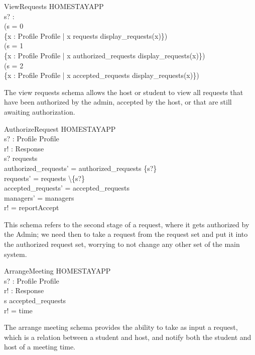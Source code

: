 \documentclass[11pt]{article}
\begin{document}
\begin{schema}{ViewRequests}
	\Xi HOMESTAYAPP\\
	s? : \nat\\
\where
	(s = 0\ \wedge\\
	\indent\{\forall x : Profile \rightarrow Profile | x \in requests \bullet display\_requests(x)\})\ \vee\\
	
	(s = 1\ \wedge\\
	\indent\{\forall x : Profile \rightarrow Profile | x \in authorized\_requests \bullet display\_requests(x)\})\ \vee\\
	
	(s = 2\ \wedge\\
	\indent\{\forall x : Profile \rightarrow Profile | x \in accepted\_requests \bullet display\_requests(x)\})
\end{schema}
The view requests schema allows the host or student to view all requests that have been authorized by the admin, accepted by the host, or that are still awaiting authorization.

\begin{schema}{AuthorizeRequest}
	\Delta HOMESTAYAPP\\
	s? : Profile \rightarrow Profile\\
	r! : Response\\
\where
	s? \in requests\\
	authorized\_requests' = authorized\_requests \cup \{s?\}\\
	requests' = requests \backslash \{s?\}\\
	accepted\_requests' = accepted_requests\\
	managers' = managers\\
	r! = reportAccept\\
\end{schema}
This schema refers to the second stage of a request, where it gets authorized by the Admin; we need then to take a request from the request set and put it into the authorized request set, worrying to not change any other set of the main system.

\begin{schema}{ArrangeMeeting}
	\Delta HOMESTAYAPP\\
	s? : Profile \rightarrow Profile\\
	r! : Response\\
\where
	s \in accepted\_requests\\
	r! = time
\end{schema}
The arrange meeting schema provides the ability to take as input a request, which is a relation between a student and host, and notify both the student and host of a meeting time.
\end{document}
